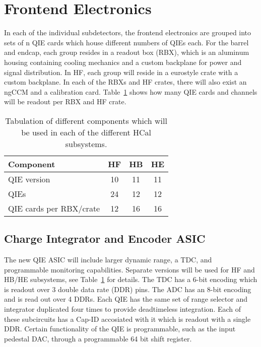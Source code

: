 \documentclass[11pt]{article} %
\begin{document}
\section{Frontend Electronics}

In each of the individual subdetectors, the frontend electronics are grouped into sets of n QIE cards which 
house different numbers of QIEs each.  For the barrel and endcap, each group resides in a readout box (RBX),
which is an aluminum housing containing cooling mechanics and a custom backplane for power and signal 
distribution.  In HF, each group will reside in a eurostyle crate with a custom backplane.  In each of the RBXs and
HF crates, there will also exist an ngCCM and a calibration card.  Table~\ref{table:frontendComponents} shows how many QIE 
cards and channels will be readout per RBX and HF crate. 


\begin{table}
\begin{center}
\begin{tabular}{|l|c|c|c|}
\hline
Component & HF & HB & HE \\
\hline \hline
QIE version & 10 & 11 & 11 \\ \hline
QIEs & 24 & 12 & 12 \\ \hline
QIE cards per RBX/crate & 12 & 16 & 16 \\ \hline 
\end{tabular}
\caption{Tabulation of different components which will be used in each of the different HCal subsystems.}
\label{table:frontendComponents}
\end{center}
\end{table}

\subsection{Charge Integrator and Encoder ASIC}

The new QIE ASIC will include larger dynamic range, a TDC, and programmable monitoring capabilities.  
Separate versions will be used for HF and HB/HE subsystems, see Table~\ref{table:frontendComponents} for
details.  The TDC has a 6-bit encoding which is readout over 3 double data rate (DDR) pins.  The ADC has an 8-bit
encoding and is read out over 4 DDRs.  Each QIE has the same set of range selector and integrator duplicated 
four times to provide deadtimeless integration.  Each of these subcircuits has a Cap-ID accosiated with it which is 
readout with a single DDR.  Certain functionality of the QIE is programmable, such as the input pedestal DAC, 
through a programmable 64 bit shift register.  
\end{document}
